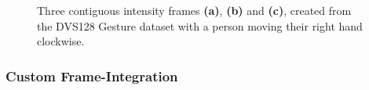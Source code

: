 \begin{figure}[htb]%
    \centering
    \qquad
    \qquad
    \caption{Three contiguous intensity frames \textbf{(a)}, \textbf{(b)} and \textbf{(c)}, created from the DVS128 Gesture dataset with a person moving their right hand clockwise.}%
    \label{fig:dvs128_integrated_frames}%
\end{figure}

\subsubsection{Custom Frame-Integration} \label{sssec:custom_frame_integration_implementation}

